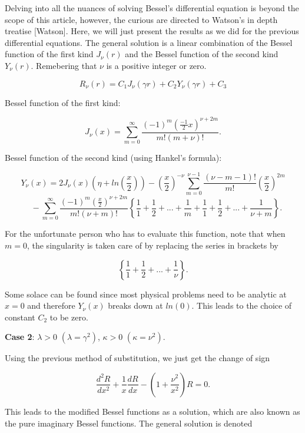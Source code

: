 \documentclass[12pt]{article}
\begin{document}
Delving into all the nuances of solving Bessel's differential equation is beyond the scope of this article, however, the curious
are directed to Watson's in depth treatise [Watson].  Here, we will just present the results as we did for the previous
differential equations.  The general solution is a linear combination of the Bessel function of the first kind $J_{\nu}(r)$
and the Bessel function of the second kind $Y_{\nu}(r)$.  Remebering  that $\nu$ is a positive integer or zero.

\begin{equation}
R_{\nu}(r) = C_1 J_{\nu}(\gamma  r) + C_2 Y_{\nu}(\gamma  r) + C_3
\end{equation}

Bessel function of the first kind:

$$J_{\nu}(x) = \sum_{m=0}^{\infty} \frac{ (-1)^m ( \frac{-1}{2}x)^{\nu + 2m} }{ m! (m + \nu)! }.$$

Bessel function of the second kind (using Hankel's formula):

$$Y_{\nu}(x) = 2J_{\nu}(x) \left (\eta + ln \left( \frac{x}{2}\right ) \right ) - \left( \frac{x}{2} \right)^{-\nu} \sum_{m=0}^{\nu-1} \frac{(\nu - m - 1)!}{m!} \left ( \frac{x}{2} \right)^{2m}$$
$$ \,\,\,\,\, -\sum_{m=0}^{\infty} \frac{ (-1)^m (\frac{x}{2})^{\nu + 2m} }{m! (\nu + m)!} \left \{ \frac{1}{1} + \frac{1}{2} + ... + \frac{1}{m}+ \frac{1}{1} + \frac{1}{2} + ...  + \frac{1}{\nu + m} \right \}.$$

For the unfortunate person who has to evaluate this function, note that when $m = 0$, the singularity is taken care of by replacing the series in brackets by

$$ \left \{ \frac{1}{1} + \frac{1}{2} + ... + \frac{1}{\nu} \right \}.$$

Some solace can be found since most physical problems need to be analytic at $x = 0$ and therefore $Y_{\nu}(x)$ breaks down at $ln(0)$.
This leads to the choice of constant $C_2$ to be zero.


{\bf Case 2}: $\lambda > 0$ $(\lambda = \gamma^2)$, $\kappa > 0$ $(\kappa = \nu^2)$.

Using the previous method of substitution, we just get the change of sign

\begin{equation}
\frac{d^2R}{dx^2} + \frac{1}{x} \frac{dR}{dx} -  \left(1 + \frac{\nu^2}{x^2} \right)R = 0.
\end{equation}

This leads to the modified Bessel functions as a solution, which are also known as the pure imaginary Bessel functions.  The
general solution is denoted
\end{document}
